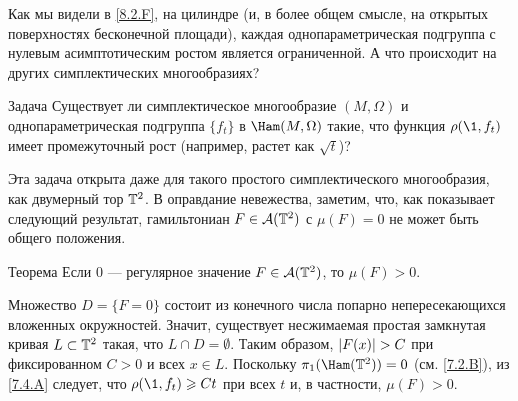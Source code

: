 Как мы видели в \ref{8.2.F}, на цилиндре 
(и, в более общем смысле, на открытых поверхностях бесконечной площади),
каждая однопараметрическая подгруппа с нулевым асимптотическим ростом является ограниченной. 
А что происходит на других симплектических многообразиях?

\begin{ex}{Задача}\label{8.4.A}
Существует ли симплектическое многообразие $(M, \Omega)$ и
однопараметрическая подгруппа $\{f_t\}$ в $\Ham (M, \Omega)$ такие,
что функция $\rho (\1, f_t)$ имеет промежуточный рост
(например, растет как $\sqrt{t}$)? 
\end{ex}

Эта задача открыта даже для такого простого симплектического
многообразия, как двумерный тор $\mathbb{T}^2$. 
В оправдание невежества, заметим, что, как показывает следующий
результат, гамильтониан $F \z\in \A (\TT^2)$ с $\mu (F) = 0$ не может быть
общего положения.

\begin{thm}{Теорема}\label{8.4.B}
Если 0 — регулярное значение $F \in \mathcal{A} (\mathbb{T}^2)$, то $\mu (F)> 0$.
\end{thm}

Множество $D = \{F = 0\}$ состоит из конечного числа попарно
непересекающихся вложенных окружностей. 
Значит, существует несжимаемая простая замкнутая кривая $L \z\subset
\TT^2$ такая, что $L\cap D = \emptyset$. 
Таким образом, $|F (x)| \z> C$ при фиксированном $C> 0$ и всех $x \in L$.
Поскольку $\pi_1 (\Ham (\TT^2)) = 0$ (см. \ref{7.2.B}),  из
\ref{7.4.A} следует, что $\rho (\1, f_t) \ge Ct$ при всех $t$ и, в
частности, $\mu (F)> 0$. 
\qeds
